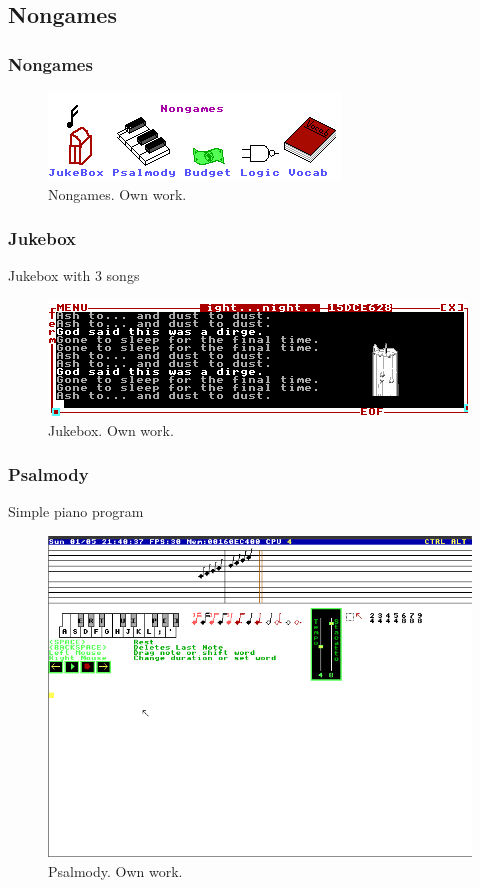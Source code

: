 \documentclass{beamer}
\begin{document}
	\subsection{Nongames}
	\begin{frame}
		\frametitle{Nongames}
		\begin{figure}
			\centering
			\includegraphics[width=0.5\linewidth]{images/nongames.png}
			\caption{Nongames. Own work.}
			\label{fig:nongames}
		\end{figure}
	\end{frame}

	\begin{frame}
		\frametitle{Jukebox}
		Jukebox with 3 songs
		\begin{figure}
			\centering
			\includegraphics[width=0.6\linewidth]{images/jukebox.png}
			\caption{Jukebox. Own work.}
			\label{fig:jukebox}
		\end{figure}
	\end{frame}

	\begin{frame}
		\frametitle{Psalmody}
		Simple piano program
		\begin{figure}
			\centering
			\includegraphics[width=0.6\linewidth]{images/psalmody.png}
			\caption{Psalmody. Own work.}
			\label{fig:psalmody}
		\end{figure}
	\end{frame}
\end{document}
